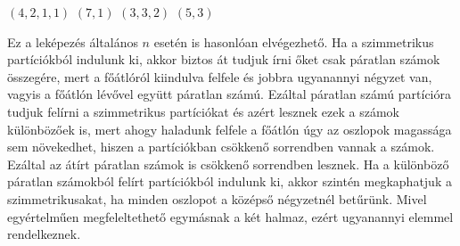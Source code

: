 \begin{solution}
\hspace{0.4cm} $(4,2,1,1)$ \hspace{2.65cm} $(7,1)$ \hspace{0.8cm}
$(3,3,2)$ \hspace{2.6cm} $(5,3)$

\vspace{0.4cm}

Ez a leképezés általános $n$ esetén is hasonlóan elvégezhető. Ha
a szimmetrikus partíciókból indulunk ki, akkor biztos át tudjuk írni
őket csak páratlan számok összegére, mert a főátlóról kiindulva felfele
és jobbra ugyanannyi négyzet van, vagyis a főátlón lévővel együtt
páratlan számú. Ezáltal páratlan számú partícióra tudjuk felírni a
szimmetrikus partíciókat és azért lesznek ezek a számok különbözőek
is, mert ahogy haladunk felfele a főátlón úgy az oszlopok magassága
sem növekedhet, hiszen a partíciókban csökkenő sorrendben vannak a
számok. Ezáltal az átírt páratlan számok is csökkenő sorrendben lesznek.
Ha a különböző páratlan számokból felírt partíciókból indulunk ki,
akkor szintén megkaphatjuk a szimmetrikusakat, ha minden oszlopot
a középső négyzetnél betűrünk. Mivel egyértelműen megfeleltethető
egymásnak a két halmaz, ezért ugyanannyi elemmel rendelkeznek. 
\end{solution}

